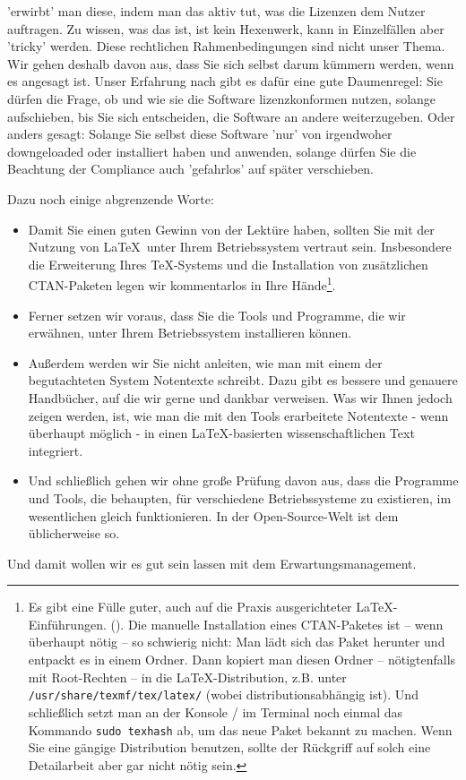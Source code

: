 {'erwirbt' man diese, indem man das aktiv tut, was die Lizenzen dem Nutzer
auftragen. Zu wissen, was das ist, ist kein Hexenwerk, kann in Einzelfällen aber
'tricky' werden. Diese rechtlichen Rahmenbedingungen sind nicht unser Thema. Wir
gehen deshalb davon aus, dass Sie sich selbst darum kümmern werden, wenn es
angesagt ist. Unser Erfahrung nach gibt es dafür eine gute Daumenregel: Sie
dürfen die Frage, ob und wie sie die Software lizenzkonformen nutzen, solange
aufschieben, bis Sie sich entscheiden, die Software an andere weiterzugeben.
Oder anders gesagt: Solange Sie selbst diese Software 'nur' von irgendwoher
downgeloaded oder installiert haben und anwenden, solange dürfen Sie die
Beachtung der Compliance auch 'gefahrlos' auf später verschieben.}

Dazu noch einige abgrenzende Worte:
\begin{itemize}
  \item Damit Sie einen guten Gewinn von der Lektüre haben, sollten Sie mit der
  Nutzung von \LaTeX\ unter Ihrem Betriebssystem vertraut sein.
  Insbesondere die Erweiterung Ihres \TeX-Systems und die Installation von
  zusätzlichen CTAN-Paketen legen wir kommentarlos in Ihre Hände\footnote{Es
  gibt eine Fülle guter, auch auf die Praxis ausgerichteter \LaTeX-Einführungen.
  (\cite[etwa][7ff]{Schlosser2016a}). Die ma\-nuelle Installation eines
  CTAN-Paketes ist -- wenn überhaupt nötig -- so schwierig nicht: Man lädt sich das
  Paket herunter und entpackt es in einem Ordner. Dann kopiert man diesen Ordner
  -- nötigtenfalls mit Root-Rechten -- in die \LaTeX-Distribution, z.B. unter
  \texttt{/usr/share/texmf/tex/latex/} (wobei 
  distributionsabhängig ist). Und schließlich setzt man an der Konsole / im
  Terminal noch einmal das Kommando \texttt{sudo texhash} ab, um das neue Paket
  bekannt zu machen. Wenn Sie eine gängige Distribution benutzen, sollte der
  Rückgriff auf solch eine Detailarbeit aber gar nicht nötig sein.}.
  \item Ferner setzen wir voraus, dass Sie die Tools und Programme, die wir
  erwähnen, unter Ihrem Betriebssystem installieren können.
  \item Außerdem werden wir Sie nicht anleiten, wie man mit einem der
  begutachteten System Notentexte schreibt. Dazu gibt es bessere und genauere
  Handbücher, auf die wir gerne und dankbar verweisen. Was wir Ihnen jedoch
  zeigen werden, ist, wie man die mit den Tools erarbeitete Notentexte - wenn
  überhaupt möglich - in einen \LaTeX-basierten wissenschaftlichen Text
  integriert.
  \item Und schließlich gehen wir ohne große Prüfung davon aus, dass die
  Programme und Tools, die behaupten, für verschiedene Betriebssysteme zu
  existieren, im wesentlichen gleich funktionieren. In der Open-Source-Welt ist
  dem üblicherweise so.
\end{itemize}

Und damit wollen wir es gut sein lassen mit dem Erwartungsmanagement.



%
